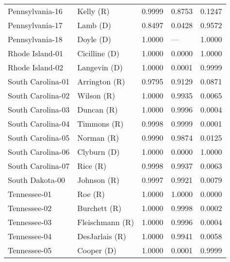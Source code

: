 \begin{longtable}{llrll}
   Pennsylvania-16 &            {\color{Red} Kelly (R)} &       0.9999 &        0.8753 &        0.1247 \\
   Pennsylvania-17 &            {\color{Blue} Lamb (D)} &       0.8497 &        0.0428 &        0.9572 \\
   Pennsylvania-18 &           {\color{Blue} Doyle (D)} &       1.0000 &           --- &        1.0000 \\
   Rhode Island-01 &       {\color{Blue} Cicilline (D)} &       1.0000 &        0.0000 &        1.0000 \\
   Rhode Island-02 &        {\color{Blue} Langevin (D)} &       1.0000 &        0.0001 &        0.9999 \\
 South Carolina-01 &        {\color{Red} Arrington (R)} &       0.9795 &        0.9129 &        0.0871 \\
 South Carolina-02 &           {\color{Red} Wilson (R)} &       1.0000 &        0.9935 &        0.0065 \\
 South Carolina-03 &           {\color{Red} Duncan (R)} &       1.0000 &        0.9996 &        0.0004 \\
 South Carolina-04 &          {\color{Red} Timmons (R)} &       0.9998 &        0.9999 &        0.0001 \\
 South Carolina-05 &           {\color{Red} Norman (R)} &       0.9990 &        0.9874 &        0.0125 \\
 South Carolina-06 &         {\color{Blue} Clyburn (D)} &       1.0000 &        0.0000 &        1.0000 \\
 South Carolina-07 &             {\color{Red} Rice (R)} &       0.9998 &        0.9937 &        0.0063 \\
   South Dakota-00 &          {\color{Red} Johnson (R)} &       0.9997 &        0.9921 &        0.0079 \\
      Tennessee-01 &              {\color{Red} Roe (R)} &       1.0000 &        1.0000 &        0.0000 \\
      Tennessee-02 &         {\color{Red} Burchett (R)} &       1.0000 &        0.9998 &        0.0002 \\
      Tennessee-03 &      {\color{Red} Fleischmann (R)} &       1.0000 &        0.9996 &        0.0004 \\
      Tennessee-04 &       {\color{Red} DesJarlais (R)} &       1.0000 &        0.9941 &        0.0058 \\
      Tennessee-05 &          {\color{Blue} Cooper (D)} &       1.0000 &        0.0001 &        0.9999 \\

\end{longtable}
